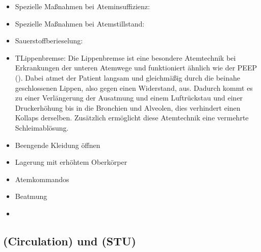 
{%
\begin{itemize}
  \item Spezielle Maßnahmen bei Ateminsuffizienz:
  \item Spezielle Maßnahmen bei Atemstillstand: 
  \item Sauerstoffberieselung: 
  \item T{Lippenbremse}: 
  \label{topic:lippenbremse-advanced}
  Die Lippenbremse ist eine besondere Atemtechnik bei Erkrankungen der unteren Atemwege 
  und funktioniert ähnlich wie der PEEP (). 
  Dabei atmet der Patient langsam und gleichmäßig durch die beinahe geschlossenen Lippen, also gegen einen Widerstand, aus. 
  Dadurch kommt es zu einer Verlängerung der Ausatmung 
  und einem Luftrückstau 
  und einer Druckerhöhung bis in die Bronchien und Alveolen, 
  dies verhindert einen Kollaps derselben.
  Zusätzlich ermöglicht diese Atemtechnik eine vermehrte Schleimablösung.
  \item Beengende Kleidung öffnen
  \item Lagerung mit erhöhtem Oberkörper
  \item Atemkommandos
  \item Beatmung
  \item \TxMassVit
\end{itemize}
}


\clearpage
\subsection{{} 
(Circulation) und  (STU)}

\label{topic:kreislauf-apam}
\label{topic:circulation-apam}







